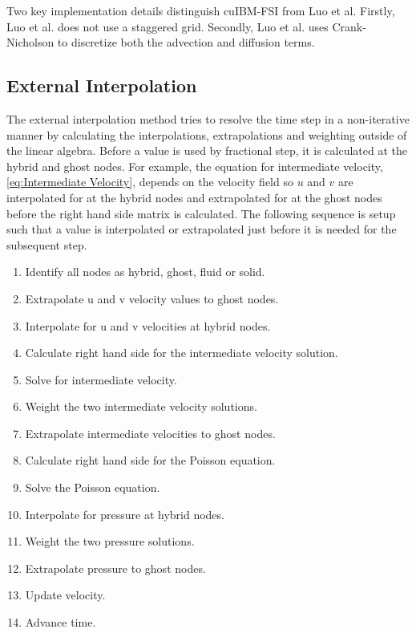 Two key implementation details distinguish cuIBM-FSI from Luo et al. 
Firstly, Luo et al. does not use a staggered grid. 
Secondly, Luo et al. uses Crank-Nicholson to discretize both the advection and diffusion terms. 

\subsection{External Interpolation}
\label{sec:ID external}
The external interpolation method tries to resolve the time step in a non-iterative manner by calculating the interpolations, extrapolations and weighting outside of the linear algebra. 
Before a value is used by fractional step, it is calculated at the hybrid and ghost nodes. 
For example, the equation for intermediate velocity,\eqref{eq:Intermediate Velocity}, depends on the velocity field so $u$ and $v$ are interpolated for at the hybrid nodes and extrapolated for at the ghost nodes before the right hand side matrix is calculated. 
The following sequence is setup such that a value is interpolated or extrapolated just before it is needed for the subsequent step. 


\begin{enumerate}
	\item Identify all nodes as hybrid, ghost, fluid or solid. 
	\item Extrapolate u and v velocity values to ghost nodes. 
	\item Interpolate for u and v velocities at hybrid nodes. 
	\item Calculate right hand side for the intermediate velocity solution. 
	\item Solve for intermediate velocity. 
	\item Weight the two intermediate velocity solutions. 
	\item Extrapolate intermediate velocities to ghost nodes. 
	\item Calculate right hand side for the Poisson equation. 
	\item Solve the Poisson equation. 
	\item Interpolate for pressure at hybrid nodes. 
	\item Weight the two pressure solutions. 
	\item Extrapolate pressure to ghost nodes. 
	\item Update velocity. 
	\item Advance time. 
\end{enumerate}

